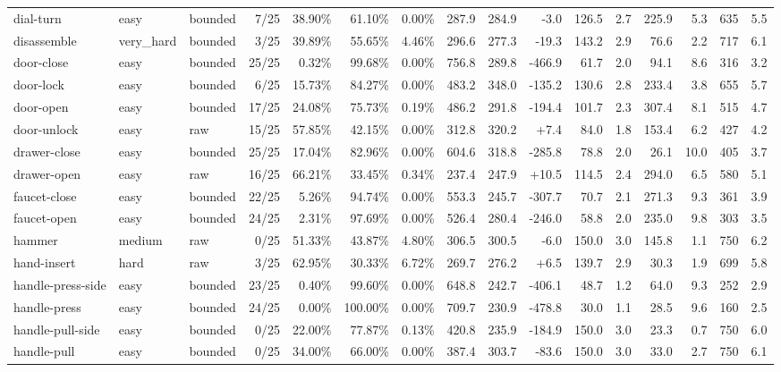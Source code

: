 \begin{landscape}
\begin{longtable}{@{}l l l r r r r r r r r r r r r r@{}}
dial-turn & easy & bounded & 7/25 & 38.90\% & 61.10\% & 0.00\% & 287.9 & 284.9 & -3.0 & 126.5 & 2.7 & 225.9 & 5.3 & 635 & 5.5 \\
disassemble & very\_hard & bounded & 3/25 & 39.89\% & 55.65\% & 4.46\% & 296.6 & 277.3 & -19.3 & 143.2 & 2.9 & 76.6 & 2.2 & 717 & 6.1 \\
door-close & easy & bounded & 25/25 & 0.32\% & 99.68\% & 0.00\% & 756.8 & 289.8 & -466.9 & 61.7 & 2.0 & 94.1 & 8.6 & 316 & 3.2 \\
door-lock & easy & bounded & 6/25 & 15.73\% & 84.27\% & 0.00\% & 483.2 & 348.0 & -135.2 & 130.6 & 2.8 & 233.4 & 3.8 & 655 & 5.7 \\
door-open & easy & bounded & 17/25 & 24.08\% & 75.73\% & 0.19\% & 486.2 & 291.8 & -194.4 & 101.7 & 2.3 & 307.4 & 8.1 & 515 & 4.7 \\
door-unlock & easy & raw & 15/25 & 57.85\% & 42.15\% & 0.00\% & 312.8 & 320.2 & +7.4 & 84.0 & 1.8 & 153.4 & 6.2 & 427 & 4.2 \\
drawer-close & easy & bounded & 25/25 & 17.04\% & 82.96\% & 0.00\% & 604.6 & 318.8 & -285.8 & 78.8 & 2.0 & 26.1 & 10.0 & 405 & 3.7 \\
drawer-open & easy & raw & 16/25 & 66.21\% & 33.45\% & 0.34\% & 237.4 & 247.9 & +10.5 & 114.5 & 2.4 & 294.0 & 6.5 & 580 & 5.1 \\
faucet-close & easy & bounded & 22/25 & 5.26\% & 94.74\% & 0.00\% & 553.3 & 245.7 & -307.7 & 70.7 & 2.1 & 271.3 & 9.3 & 361 & 3.9 \\
faucet-open & easy & bounded & 24/25 & 2.31\% & 97.69\% & 0.00\% & 526.4 & 280.4 & -246.0 & 58.8 & 2.0 & 235.0 & 9.8 & 303 & 3.5 \\
hammer & medium & raw & 0/25 & 51.33\% & 43.87\% & 4.80\% & 306.5 & 300.5 & -6.0 & 150.0 & 3.0 & 145.8 & 1.1 & 750 & 6.2 \\
hand-insert & hard & raw & 3/25 & 62.95\% & 30.33\% & 6.72\% & 269.7 & 276.2 & +6.5 & 139.7 & 2.9 & 30.3 & 1.9 & 699 & 5.8 \\
handle-press-side & easy & bounded & 23/25 & 0.40\% & 99.60\% & 0.00\% & 648.8 & 242.7 & -406.1 & 48.7 & 1.2 & 64.0 & 9.3 & 252 & 2.9 \\
handle-press & easy & bounded & 24/25 & 0.00\% & 100.00\% & 0.00\% & 709.7 & 230.9 & -478.8 & 30.0 & 1.1 & 28.5 & 9.6 & 160 & 2.5 \\
handle-pull-side & easy & bounded & 0/25 & 22.00\% & 77.87\% & 0.13\% & 420.8 & 235.9 & -184.9 & 150.0 & 3.0 & 23.3 & 0.7 & 750 & 6.0 \\
handle-pull & easy & bounded & 0/25 & 34.00\% & 66.00\% & 0.00\% & 387.4 & 303.7 & -83.6 & 150.0 & 3.0 & 33.0 & 2.7 & 750 & 6.1 \\

\end{longtable}
\end{landscape}
